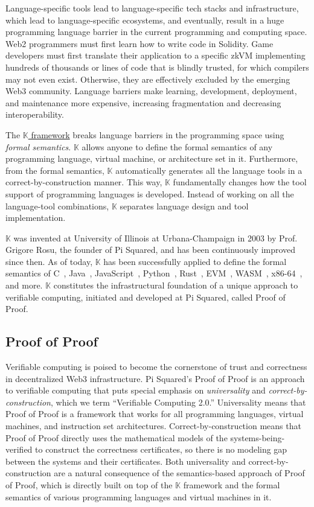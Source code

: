 \documentclass{article}
\newcommand{\K}{\ensuremath{\mathbb{K}}\xspace}
\begin{document}
Language-specific tools lead to language-specific tech stacks and infrastructure,
which lead to language-specific ecosystems,
and eventually, result in a huge programming language barrier
in the current programming and computing space. 
Web2 programmers must first learn how to write code in Solidity.
Game developers must first translate their application to a specific zkVM implementing hundreds of thousands or lines of code that is blindly trusted, for which compilers may not even exist. 
Otherwise, they are effectively excluded by the emerging Web3 community. 
Language barriers make learning, development, deployment, and maintenance
more expensive,
increasing fragmentation and decreasing interoperability. 

The \href{https://kframework.org}{\K framework} breaks language barriers in the programming space using 
\emph{formal semantics}. 
\K allows anyone to define the formal semantics
of any programming language, virtual machine, or architecture set in it.
Furthermore, from the formal semantics, \K automatically generates all the language tools in a correct-by-construction manner. 
This way, \K fundamentally changes how the tool support of programming languages
is developed. 
Instead of working on all the language-tool combinations, 
\K separates language design and tool implementation.

\K was invented at University of Illinois at Urbana-Champaign in 2003
by Prof. Grigore Rosu, the founder of Pi Squared,
and has been continuously improved since then.
As of today, 
\K has been successfully applied to define the formal semantics of 
C~\cite{c-semantics}, 
Java~\cite{java-semantics}, 
JavaScript~\cite{kjs}, 
Python~\cite{python-semantics}, 
Rust~\cite{krust-shanghai,krust-singapore},
EVM~\cite{kevm}, 
WASM~\cite{kwasm}, 
x86-64~\cite{DPK+19}, 
and more.
\K constitutes the infrastructural foundation of a unique approach 
to verifiable computing,
initiated and developed at Pi Squared, called Proof of Proof.



\subsection{Proof of Proof}

Verifiable computing is poised to become the cornerstone of trust and correctness in decentralized Web3 infrastructure. 
Pi Squared's Proof of Proof is an approach to verifiable computing that puts
special emphasis on \emph{universality} and \emph{correct-by-construction}, 
which we term ``Verifiable Computing 2.0.''
Universality means that Proof of Proof is a framework that works for all programming
languages, virtual machines, and instruction set architectures. 
Correct-by-construction means that Proof of Proof directly uses the mathematical models
of the systems-being-verified to construct the correctness certificates, so there is
no modeling gap between the systems and their certificates. 
Both universality and correct-by-construction are a natural consequence of the semantics-based approach of Proof of Proof,
which is directly built on top of the \K framework
and the formal semantics of various programming languages and virtual machines in it. 
\end{document}
